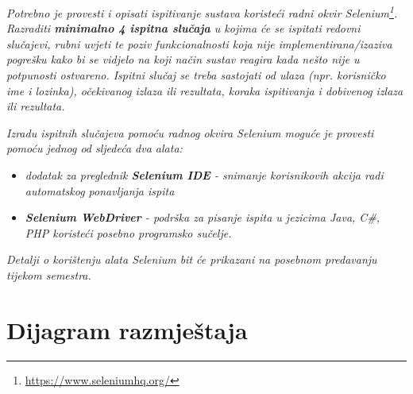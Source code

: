 			 \textit{Potrebno je provesti i opisati ispitivanje sustava koristeći radni okvir Selenium\footnote{\url{https://www.seleniumhq.org/}}. Razraditi \textbf{minimalno 4 ispitna slučaja} u kojima će se ispitati redovni slučajevi, rubni uvjeti te poziv funkcionalnosti koja nije implementirana/izaziva pogrešku kako bi se vidjelo na koji način sustav reagira kada nešto nije u potpunosti ostvareno. Ispitni slučaj se treba sastojati od ulaza (npr. korisničko ime i lozinka), očekivanog izlaza ili rezultata, koraka ispitivanja i dobivenog izlaza ili rezultata.\\ }
			 
			 \textit{Izradu ispitnih slučajeva pomoću radnog okvira Selenium moguće je provesti pomoću jednog od sljedeća dva alata:}
			 \begin{itemize}
			 	\item \textit{dodatak za preglednik \textbf{Selenium IDE} - snimanje korisnikovih akcija radi automatskog ponavljanja ispita	}
			 	\item \textit{\textbf{Selenium WebDriver} - podrška za pisanje ispita u jezicima Java, C\#, PHP koristeći posebno programsko sučelje.}
			 \end{itemize}
		 	\textit{Detalji o korištenju alata Selenium bit će prikazani na posebnom predavanju tijekom semestra.}
			
			\eject 
		
		
		\section{Dijagram razmještaja}
			
			
			
			
			
